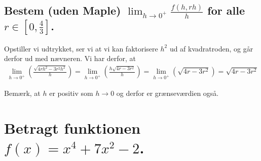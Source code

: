 \documentclass[11pt,a4paper]{article}
\newcommand{\limit}[2]{\lim_{#1 \rightarrow #2}}
\begin{document}
\newpage
\subsection
{
    \mdseries
    Bestem (uden Maple) $\limit{h}{0^+} \frac{f(h, rh)}{h}$ for alle $r \in
    [0,\frac{4}{3}]$.
}
Opstiller vi udtrykket, ser vi at vi kan faktorisere $h^2$ ud af kvadratroden,
og går derfor ud med nævneren. Vi har derfor, at
\begin{align}
    \limit{h}{0^+} \left( \frac{\sqrt{4 r h^2 - 3 r^2 h^2}}{h} \right)
     = \limit{h}{0^+} \left( \frac{h \sqrt{4 r - 3 r^2}}{h} \right)
     = \limit{h}{0^+} \left( \sqrt{4 r - 3 r^2} \right)
     = \sqrt{4 r - 3 r^2}
\end{align}

Bemærk, at $h$ er positiv som $h \rightarrow 0$ og derfor er grænseværdien også.

\section
{
    \mdseries
    Betragt funktionen $f(x) = x^4 + 7x^2 - 2$.
}

\end{document}
